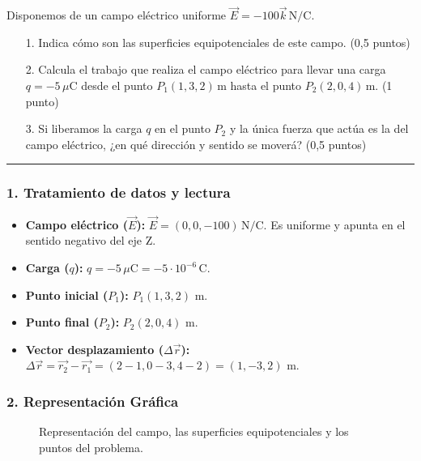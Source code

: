 \begin{cajaenunciado}
Disponemos de un campo eléctrico uniforme $\vec{E}=-100\vec{k}\,\text{N/C}$.
\begin{enumerate}
    \item[1.] Indica cómo son las superficies equipotenciales de este campo. (0,5 puntos)
    \item[2.] Calcula el trabajo que realiza el campo eléctrico para llevar una carga $q=-5\,\mu\text{C}$ desde el punto $P_1(1,3,2)\,\text{m}$ hasta el punto $P_2(2,0,4)\,\text{m}$. (1 punto)
    \item[3.] Si liberamos la carga $q$ en el punto $P_2$ y la única fuerza que actúa es la del campo eléctrico, ¿en qué dirección y sentido se moverá? (0,5 puntos)
\end{enumerate}
\end{cajaenunciado}
\hrule

\subsubsection*{1. Tratamiento de datos y lectura}
\begin{itemize}
    \item \textbf{Campo eléctrico ($\vec{E}$):} $\vec{E} = (0, 0, -100) \, \text{N/C}$. Es uniforme y apunta en el sentido negativo del eje Z.
    \item \textbf{Carga ($q$):} $q = -5 \, \mu\text{C} = -5 \cdot 10^{-6} \, \text{C}$.
    \item \textbf{Punto inicial ($P_1$):} $P_1(1, 3, 2)$ m.
    \item \textbf{Punto final ($P_2$):} $P_2(2, 0, 4)$ m.
    \item \textbf{Vector desplazamiento ($\Delta\vec{r}$):} $\Delta\vec{r} = \vec{r_2} - \vec{r_1} = (2-1, 0-3, 4-2) = (1, -3, 2)$ m.
\end{itemize}

\subsubsection*{2. Representación Gráfica}
\begin{figure}[H]
    \centering
    \caption{Representación del campo, las superficies equipotenciales y los puntos del problema.}
\end{figure}

